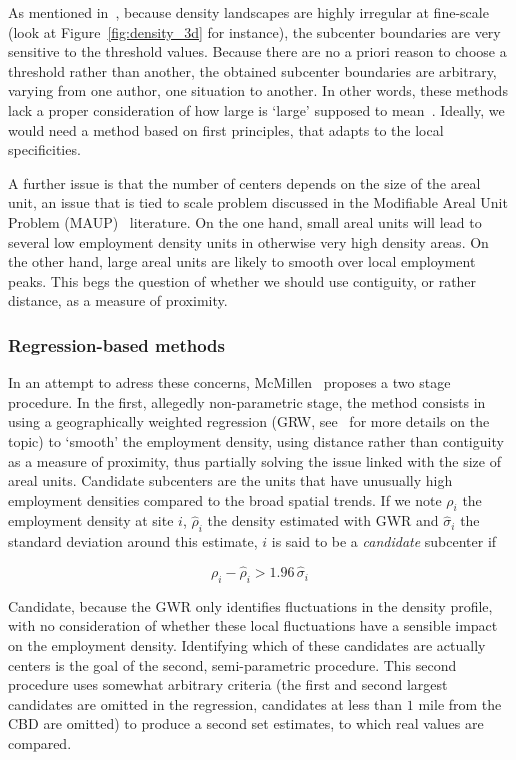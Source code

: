 As mentioned in~\cite{Anas:1998}, because density landscapes are highly
irregular at fine-scale (look at Figure~\ref{fig:density_3d} for instance), the
subcenter boundaries are very sensitive to the threshold values. Because there
are no a priori reason to choose a threshold rather than another, the obtained
subcenter boundaries are arbitrary, varying from one author, one situation to
another. In other words, these methods lack a proper consideration of how large is `large' supposed to mean~\cite{McMillen:2003}.
Ideally, we would need a method based on first principles, that adapts to the
local specificities.

A further issue is that the number of centers depends on the size of the areal unit, an
issue that is tied to scale problem discussed in the Modifiable Areal Unit
Problem (MAUP)~\cite{Openshaw:1984} literature. On the one hand, small areal units will
lead to several low employment density units in otherwise very high density
areas. On the other hand, large areal units are likely to smooth over local
employment peaks. This begs the question of whether we should use contiguity, or
rather distance, as a measure of proximity.\\


\subsubsection{Regression-based methods}
\label{ssub:regression_based_methods}

In an attempt to adress these concerns, McMillen~\cite{McMillen:2001} proposes a two stage
procedure. In the first, allegedly non-parametric stage, the method consists in using a
geographically weighted regression (GRW, see~\cite{Brunsdon:1998} for more details on
the topic) to `smooth' the employment density, using distance rather
than contiguity as a measure of proximity, thus partially solving the issue
linked with the size of areal units. 
Candidate subcenters are the units that have unusually high employment densities
compared to the broad spatial trends.  If we note $\rho_i$ the employment
density at site $i$, $\hat{\rho}_i$ the density estimated with GWR and
$\hat{\sigma}_i$ the standard deviation around this estimate, $i$ is said to be
a \emph{candidate} subcenter if 

\begin{equation*}
    \rho_i - \hat{\rho}_i > 1.96\,\hat{\sigma}_i
\end{equation*}

Candidate, because the GWR only identifies fluctuations in the density profile,
with no consideration of whether these local fluctuations have a sensible impact
on the employment density.  Identifying which of these candidates are actually
centers is the goal of the second, semi-parametric procedure. This second
procedure uses somewhat arbitrary criteria (the first and second largest
candidates are omitted in the regression, candidates at less than $1$ mile from
the CBD are omitted) to produce a second set estimates, to which real values are
compared.\\

